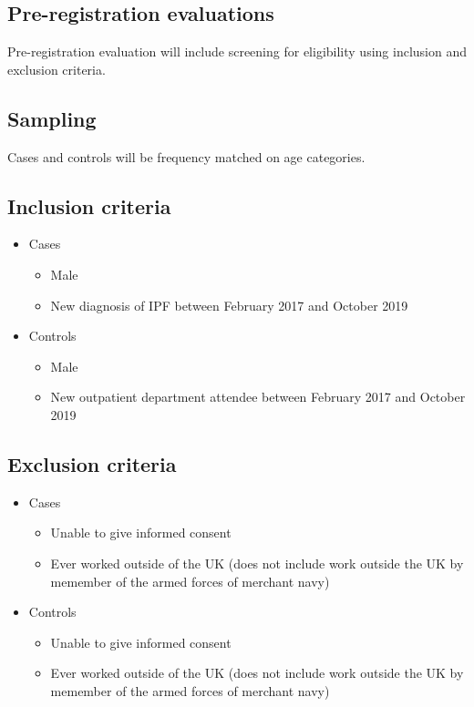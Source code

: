 \documentclass[a4paper,10pt]{article}
\newcommand{\studystart}{February 2017 }
\newcommand{\studyend}{October 2019 }
\begin{document}
\subsection{Pre-registration evaluations}
Pre-registration evaluation will include screening for eligibility using inclusion and exclusion criteria.

\subsection{Sampling}
Cases and controls will be frequency matched on age categories.

\subsection{Inclusion criteria}
\begin{itemize}
 \item Cases \begin{itemize}
        \item Male
        \item New diagnosis of IPF between \studystart and \studyend 
       \end{itemize}
       
  \item Controls \begin{itemize}
        \item Male
        \item New outpatient department attendee between \studystart and \studyend
       \end{itemize}

\end{itemize}


\subsection{Exclusion criteria}
\begin{itemize}
 \item Cases \begin{itemize}
        \item Unable to give informed consent
        \item Ever worked outside of the UK (does not include work outside the UK by memember of the armed forces of merchant navy)
       \end{itemize}
       
  \item Controls \begin{itemize}
        \item Unable to give informed consent
        \item Ever worked outside of the UK (does not include work outside the UK by memember of the armed forces of merchant navy)
       \end{itemize}

\end{itemize}
\end{document}

